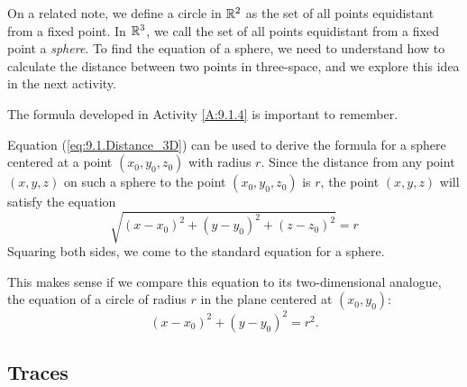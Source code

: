 On a related note, we define a circle in $\mathbb{R}^2$ as the set of all
points equidistant from a fixed point. In $\mathbb{R}^3$, we call the set of
all points equidistant from a fixed point a
\emph{sphere}. To find the equation of a
sphere, we need to understand how to calculate the distance between
two points in three-space, and we explore this idea in the next
activity.



The formula developed in Activity \ref{A:9.1.4} is important to remember.

\vspace*{5pt}
\nin {}
\vspace*{5pt}

Equation (\ref{eq:9.1.Distance_3D}) can be used to derive the formula
for a sphere centered at a point $(x_0,y_0,z_0)$
with radius $r$. Since the distance from any point $(x,y,z)$ on such a
sphere to the point $(x_0,y_0,z_0)$ is $r$, the point $(x,y,z)$ will
satisfy the equation
\[\sqrt{(x-x_0)^2 + (y-y_0)^2 + (z-z_0)^2} = r\]
Squaring both sides, we come to the standard equation for a sphere.

\vspace*{5pt}
\nin {}
\vspace*{5pt}

This makes sense if we compare this equation to its two-dimensional
analogue, the equation of a circle of radius $r$ in the plane centered
at $(x_0,y_0)$:
$$
(x-x_0)^2 + (y-y_0)^2 = r^2.
$$


%

\subsection*{Traces}

